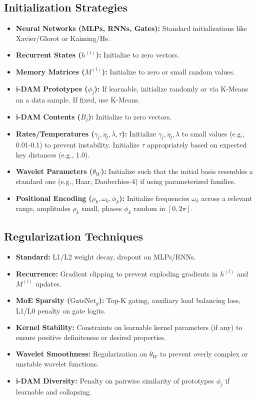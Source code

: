 \documentclass{article}
\begin{document}
\subsection{Initialization Strategies}
\begin{itemize}
    \item \textbf{Neural Networks (MLPs, RNNs, Gates):} Standard initializations like Xavier/Glorot or Kaiming/He.
    \item \textbf{Recurrent States ($h^{(l)}$):} Initialize to zero vectors.
    \item \textbf{Memory Matrices ($M^{(l)}$):} Initialize to zero or small random values.
    \item \textbf{i-DAM Prototypes ($\phi_j$):} If learnable, initialize randomly or via K-Means on a data sample. If fixed, use K-Means.
    \item \textbf{i-DAM Contents ($B_j$):} Initialize to zero vectors.
    \item \textbf{Rates/Temperatures ($\gamma_l, \eta_l, \lambda, \tau$):} Initialize $\gamma_l, \eta_l, \lambda$ to small values (e.g., 0.01-0.1) to prevent instability. Initialize $\tau$ appropriately based on expected key distances (e.g., 1.0).
    \item \textbf{Wavelet Parameters ($\theta_W$):} Initialize such that the initial basis resembles a standard one (e.g., Haar, Daubechies-4) if using parameterized families.
    \item \textbf{Positional Encoding ($\rho_k, \omega_k, \phi_k$):} Initialize frequencies $\omega_k$ across a relevant range, amplitudes $\rho_k$ small, phases $\phi_k$ random in $[0, 2\pi]$.
\end{itemize}

\subsection{Regularization Techniques}
\begin{itemize}
    \item \textbf{Standard:} L1/L2 weight decay, dropout on MLPs/RNNs.
    \item \textbf{Recurrence:} Gradient clipping to prevent exploding gradients in $h^{(l)}$ and $M^{(l)}$ updates.
    \item \textbf{MoE Sparsity ($\text{GateNet}_g$):} Top-K gating, auxiliary load balancing loss, L1/L0 penalty on gate logits.
    \item \textbf{Kernel Stability:} Constraints on learnable kernel parameters (if any) to ensure positive definiteness or desired properties.
    \item \textbf{Wavelet Smoothness:} Regularization on $\theta_W$ to prevent overly complex or unstable wavelet functions.
    \item \textbf{i-DAM Diversity:} Penalty on pairwise similarity of prototypes $\phi_j$ if learnable and collapsing.
\end{itemize}
\end{document}
